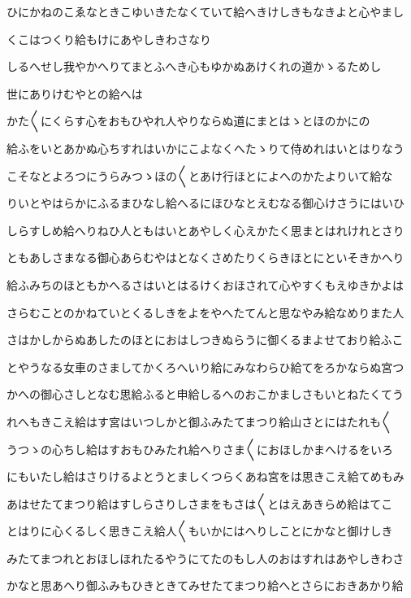 \documentclass[a4paper,11pt,landscape]{ltjtarticle}
\begin{document}
ひにかねのこゑなときこゆいきたなくていて給へきけしきもなきよと心やまし
\par\medskip
くこはつくり給もけにあやしきわさなり
\par\medskip
しるへせし我やかへりてまとふへき心もゆかぬあけくれの道かゝるためし
\par\medskip
世にありけむやとの給へは
\par\medskip
かた〱にくらす心をおもひやれ人やりならぬ道にまとはゝとほのかにの
\par\medskip
給ふをいとあかぬ心ちすれはいかにこよなくへたゝりて侍めれはいとはりなう
\par\medskip
こそなとよろつにうらみつゝほの〱とあけ行ほとによへのかたよりいて給な
\par\medskip
りいとやはらかにふるまひなし給へるにほひなとえむなる御心けさうにはいひ
\par\medskip
しらすしめ給へりねひ人ともはいとあやしく心えかたく思まとはれけれとさり
\par\medskip
ともあしさまなる御心あらむやはとなくさめたりくらきほとにといそきかへり
\par\medskip
給ふみちのほともかへるさはいとはるけくおほされて心やすくもえゆきかよは
\par\medskip
さらむことのかねていとくるしきをよをやへたてんと思なやみ給なめりまた人
\par\medskip
さはかしからぬあしたのほとにおはしつきぬらうに御くるまよせており給ふこ
\par\medskip
とやうなる女車のさましてかくろへいり給にみなわらひ給てをろかならぬ宮つ
\par\medskip
かへの御心さしとなむ思給ふると申給しるへのおこかましさもいとねたくてう
\par\medskip
れへもきこえ給はす宮はいつしかと御ふみたてまつり給山さとにはたれも〱
\par\medskip
うつゝの心ちし給はすおもひみたれ給へりさま〱におほしかまへけるをいろ
\par\medskip
にもいたし給はさりけるよとうとましくつらくあね宮をは思きこえ給てめもみ
\par\medskip
あはせたてまつり給はすしらさりしさまをもさは〱とはえあきらめ給はてこ
\par\medskip
とはりに心くるしく思きこえ給人〱もいかにはへりしことにかなと御けしき
\par\medskip
みたてまつれとおほしほれたるやうにてたのもし人のおはすれはあやしきわさ
\par\medskip
かなと思あへり御ふみもひきときてみせたてまつり給へとさらにおきあかり給
\par\medskip
\end{document}

